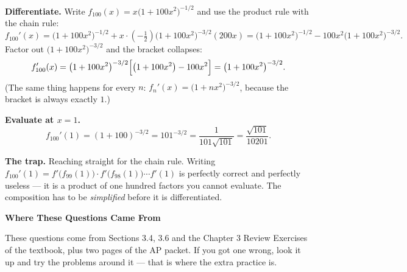 \documentclass[11pt]{article}
\begin{document}
\medskip
\noindent\textbf{Differentiate.} Write $f_{100}(x)=x\bigl(1+100x^{2}\bigr)^{-1/2}$ and use the
product rule with the chain rule:
\[
  f_{100}'(x)=\bigl(1+100x^{2}\bigr)^{-1/2}
             +x\cdot\left(-\tfrac{1}{2}\right)\bigl(1+100x^{2}\bigr)^{-3/2}(200x)
            =\bigl(1+100x^{2}\bigr)^{-1/2}-100x^{2}\bigl(1+100x^{2}\bigr)^{-3/2}.
\]
Factor out $\bigl(1+100x^{2}\bigr)^{-3/2}$ and the bracket collapses:
\[
  f_{100}'(x)=\bigl(1+100x^{2}\bigr)^{-3/2}\Bigl[\bigl(1+100x^{2}\bigr)-100x^{2}\Bigr]
             =\bigl(1+100x^{2}\bigr)^{-3/2}.
\]
(The same thing happens for every $n$: $f_{n}'(x)=\bigl(1+nx^{2}\bigr)^{-3/2}$, because the
bracket is always exactly $1$.)

\medskip
\noindent\textbf{Evaluate at $x=1$.}
\[
  f_{100}'(1)=(1+100)^{-3/2}=101^{-3/2}=\frac{1}{101\sqrt{101}}
             =\frac{\sqrt{101}}{10201}.
\]

\medskip
\noindent\textbf{The trap.} Reaching straight for the chain rule. Writing
$f_{100}'(1)=f'\bigl(f_{99}(1)\bigr)\cdot f'\bigl(f_{98}(1)\bigr)\cdots f'(1)$ is perfectly
correct and perfectly useless --- it is a product of one hundred factors you cannot evaluate.
The composition has to be \emph{simplified} before it is differentiated.

\clearpage
\begin{center}\Large\textbf{Where These Questions Came From}\end{center}
\medskip

\noindent These questions come from Sections 3.4, 3.6 and the Chapter 3 Review Exercises
of the textbook, plus two pages of the AP packet. If you got one wrong, look it up and try
the problems around it --- that is where the extra practice is.
\medskip
\end{document}
